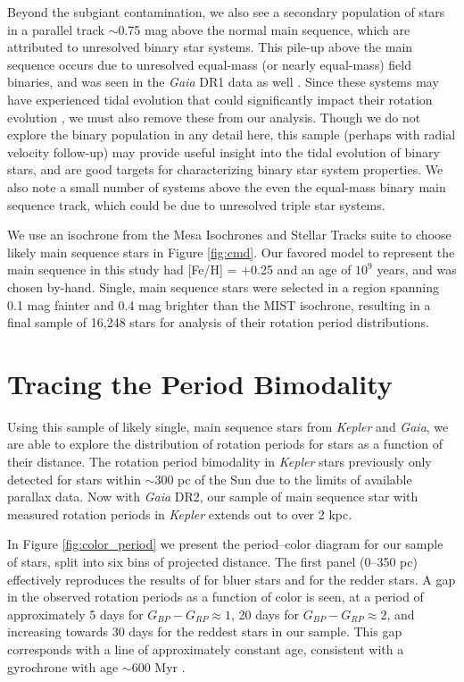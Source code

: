 \documentclass[preprint2]{aastex62}
\newcommand{\Kepler}{\textsl{Kepler}\xspace}
\begin{document}
Beyond the subgiant contamination, we also see a secondary population of stars in a parallel track $\sim$0.75 mag above the normal main sequence, which are attributed to unresolved binary star systems. This pile-up above the main sequence occurs due to unresolved equal-mass (or nearly equal-mass) field binaries, and was seen in the {\em Gaia} DR1 data as well \citep{anderson2017}. Since these systems may have experienced tidal evolution that could significantly impact their rotation evolution \citep[e.g.][]{lurie2017}, we must also remove these from our analysis. Though we do not explore the binary population in any detail here, this sample (perhaps with radial velocity follow-up) may provide useful insight into the tidal evolution of binary stars, and are good targets for characterizing binary star system properties. We also note a small number of systems above the even the equal-mass binary main sequence track, which could be due to unresolved triple star systems.

We use an isochrone from the Mesa Isochrones and Stellar Tracks suite \citep[MIST;][]{MIST} to choose likely main sequence stars in Figure \ref{fig:cmd}. Our favored model to represent the main sequence in this study had [Fe/H] = +0.25 and an age of $10^9$ years, and was chosen by-hand. Single, main sequence stars were selected in a region spanning 0.1 mag fainter and 0.4 mag brighter than the MIST isochrone, resulting in a final sample of 16,248 stars for analysis of their rotation period distributions.









\section{Tracing the Period Bimodality}


Using this sample of likely single, main sequence stars from \Kepler and {\em Gaia}, we are able to explore the distribution of rotation periods for stars as a function of their distance. The rotation period bimodality in \Kepler stars previously only detected for stars within $\sim$300 pc of the Sun due to the limits of available parallax data. Now with {\em Gaia} DR2, our sample of main sequence star with measured rotation periods in \Kepler extends out to over 2 kpc.


In Figure \ref{fig:color_period} we present the period--color diagram for our sample of stars, split into six bins of projected distance. The first panel (0--350 pc) effectively reproduces the results of \citet{davenport2017} for bluer stars and \citet{mcquillan2014} for the redder stars. A gap in the observed rotation periods as a function of color is seen, at a period of approximately 5 days for $G_{BP}-G_{RP}\approx1$, 20 days for $G_{BP}-G_{RP}\approx2$, and increasing towards 30 days for the reddest stars in our sample. This gap corresponds with a line of approximately constant age, consistent with a gyrochrone with age $\sim$600 Myr \citep{davenport2017}. 
\end{document}
